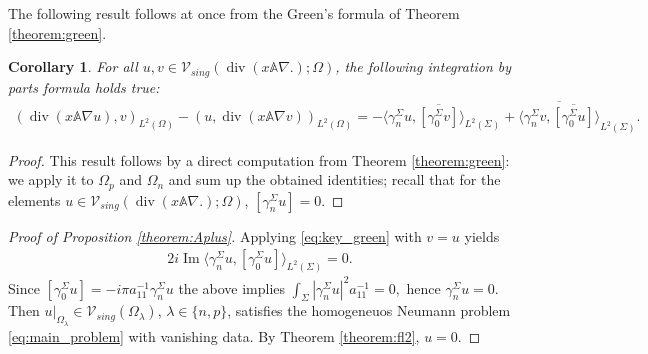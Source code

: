 \documentclass[report]{elsarticle}
\newtheorem{corollary}[theorem]{Corollary}
\numberwithin{theorem}{section}
\renewcommand{\Im}{\operatorname{Im}}
\begin{document}
The following result follows at once from the Green's formula of Theorem \ref{theorem:green}.
\begin{corollary}
	For all $u, v\in \mathcal{V}_{sing}(\operatorname{div}(x\mathbb{A}\nabla.); \Omega)$, the following integration by parts formula holds true: 
	\begin{align}
		\label{eq:key_green}
		(\operatorname{div}(x\mathbb{A}\nabla u), v)_{L^2(\Omega)}-(u, \operatorname{div}(x\mathbb{A}\nabla v))_{L^2(\Omega)}=-\langle \gamma_n^{\Sigma}u, \overline{[\gamma_0^{\Sigma}v]}\rangle_{L^2(\Sigma)}
		+\overline{\langle \gamma_n^{\Sigma}v, \overline{[\gamma_0^{\Sigma}u]}\rangle}_{L^2(\Sigma)}.
	\end{align}
\end{corollary}
\begin{proof}
	This result follows by a direct computation from Theorem \ref{theorem:green}: we apply it to $\Omega_p$ and $\Omega_n$ and sum up the obtained identities; recall that for the elements $u\in \mathcal{V}_{sing}(\operatorname{div}(x\mathbb{A}\nabla.); \Omega)$, $[\gamma_n^{\Sigma}u]=0$. 
\end{proof}
\begin{proof}[Proof of Proposition \ref{theorem:Aplus}]
	Applying \eqref{eq:key_green} with $v=u$ yields 
	\begin{align*}
		2i\Im	\langle \gamma_n^{\Sigma}u, [\gamma_0^{\Sigma}u]\rangle_{L^2(\Sigma)} =0.
	\end{align*}
	Since $[\gamma_0^{\Sigma}u]=-i\pi a_{11}^{-1}\gamma_n^{\Sigma}u$ the above implies  $
	\int_{\Sigma}|\gamma_n^{\Sigma}u|^2 a_{11}^{-1}=0, $
	hence $\gamma_n^{\Sigma}u=0$. Then $\left.u\right|_{\Omega_{\lambda}}\in \mathcal{V}_{sing}(\Omega_{\lambda})$, $\lambda\in \{n,p\}$, satisfies the homogeneuos Neumann problem \eqref{eq:main_problem} with vanishing data.  
	By Theorem \ref{theorem:fl2}, $u=0$.
\end{proof}
\end{document}
